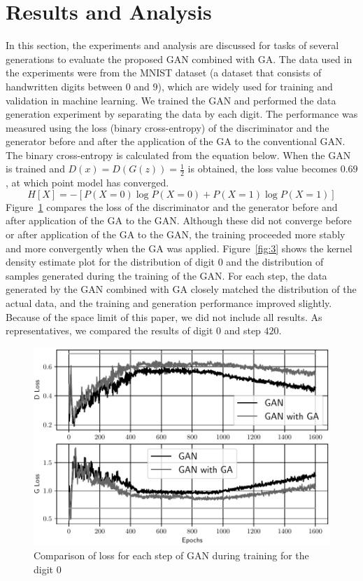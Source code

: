 \section{Results and Analysis}
\label{sec:results}
In this section, the experiments and analysis are discussed for tasks of several generations to evaluate the proposed GAN combined with GA. The data used in the experiments were from the MNIST dataset (a dataset that consists of handwritten digits between \(0\) and \(9\)), which are widely used for training and validation in machine learning. We trained the GAN and performed the data generation experiment by separating the data by each digit. The performance was measured using the loss (binary cross-entropy) of the discriminator and the generator before and after the application of the GA to the conventional GAN. The binary cross-entropy is calculated from the equation below. When the GAN is trained and \(D\left(x\right)=D\left(G\left(z\right)\right) = \frac{1}{2}\) is obtained, the loss value becomes \(0.69\), at which point model has converged.
\begin{equation}
    H\left[X\right] = -\left[P\left(X=0\right)\log{P\left(X=0\right) + P\left(X=1\right)\log{P\left(X=1\right)}}\right]
\end{equation}
Figure~\ref{fig:2} compares the loss of the discriminator and the generator before and after application of the GA to the GAN. Although these did not converge before or after application of the GA to the GAN, the training proceeded more stably and more convergently when the GA was applied. Figure~\ref{fig:3} shows the kernel density estimate plot for the distribution of digit \(0\) and the distribution of samples generated during the training of the GAN. For each step, the data generated by the GAN combined with GA closely matched the distribution of the actual data, and the training and generation performance improved slightly. Because of the space limit of this paper, we did not include all results. As representatives, we compared the results of digit \(0\) and step \(420\).
\begin{figure}[t]
\centering
\includegraphics[width=\columnwidth]{figure-2}
\caption{Comparison of loss for each step of GAN during training for the digit \(0\)}
\label{fig:2}
\end{figure}

